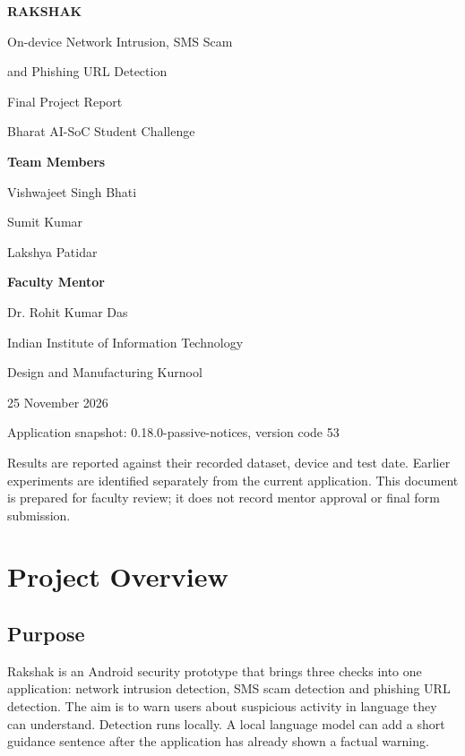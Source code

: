 \documentclass[11pt,a4paper]{article}
\newcommand{\chapterpage}[1]{\clearpage\section{#1}}
\begin{document}
\begin{titlepage}
\centering
\vspace*{16mm}
{\Huge\bfseries RAKSHAK\par}
\vspace{7mm}
{\Large On-device Network Intrusion, SMS Scam\par and Phishing URL Detection\par}
\vspace{12mm}
{\large Final Project Report\par}
{\normalsize Bharat AI-SoC Student Challenge\par}
\vspace{18mm}
{\large\bfseries Team Members\par}
\vspace{4mm}
{\large Vishwajeet Singh Bhati\par Sumit Kumar\par Lakshya Patidar\par}
\vspace{14mm}
{\large\bfseries Faculty Mentor\par}
\vspace{3mm}
{\large Dr. Rohit Kumar Das\par}
\vfill
{\large Indian Institute of Information Technology\par Design and Manufacturing Kurnool\par}
\vspace{8mm}
{\normalsize 25 November 2026\par}
\vspace{3mm}
{\small Application snapshot: 0.18.0-passive-notices, version code 53\par}
\end{titlepage}

\clearpage
\setcounter{page}{2}
\thispagestyle{plain}
\renewcommand{\contentsname}{Index}
\tableofcontents
\vfill
{\small Results are reported against their recorded dataset, device and test date.
Earlier experiments are identified separately from the current application.
This document is prepared for faculty review; it does not record mentor approval or final form submission.}

\chapterpage{Project Overview}
\subsection*{Purpose}
Rakshak is an Android security prototype that brings three checks into one application:
network intrusion detection, SMS scam detection and phishing URL detection.
The aim is to warn users about suspicious activity in language they can understand.
Detection runs locally. A local language model can add a short guidance sentence after the application has already shown a factual warning.
\end{document}
